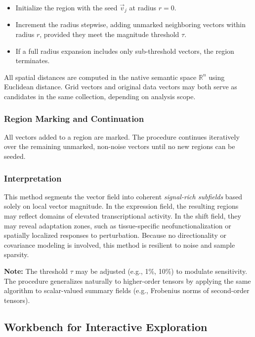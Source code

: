             \begin{itemize}
                \item Initialize the region with the seed \( \vec{v}_j \) at radius \( r = 0 \).
                \item Increment the radius stepwise, adding unmarked neighboring vectors within radius \( r \), provided they meet the magnitude threshold \( \tau \).
                \item If a full radius expansion includes only sub-threshold vectors, the region terminates.
            \end{itemize}

            All spatial distances are computed in the native semantic space \( \mathbb{R}^n \) using Euclidean distance. Grid vectors and original data vectors may both serve as candidates in the same collection, depending on analysis scope.

        \subsubsection{Region Marking and Continuation}

            All vectors added to a region are marked. The procedure continues iteratively over the remaining unmarked, non-noise vectors until no new regions can be seeded.

        \subsubsection{Interpretation}

            This method segments the vector field into coherent \emph{signal-rich subfields} based solely on local vector magnitude. In the expression field, the resulting regions may reflect domains of elevated transcriptional activity. In the shift field, they may reveal adaptation zones, such as tissue-specific neofunctionalization or spatially localized responses to perturbation. Because no directionality or covariance modeling is involved, this method is resilient to noise and sample sparsity.

            \textbf{Note:} The threshold \( \tau \) may be adjusted (e.g., 1\%, 10\%) to modulate sensitivity. The procedure generalizes naturally to higher-order tensors by applying the same algorithm to scalar-valued summary fields (e.g., Frobenius norms of second-order tensors).

    \subsection{Workbench for Interactive Exploration}\label{sec:workbench}

